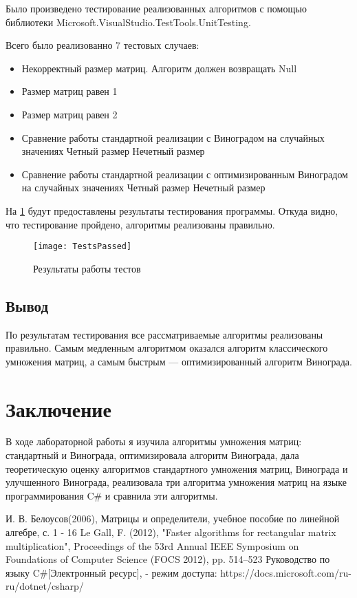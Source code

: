 \documentclass[12pt]{report}
\begin{document}
Было произведено тестирование реализованных алгоритмов с помощью библиотеки Microsoft.VisualStudio.TestTools.UnitTesting.

Всего было реализованно 7 тестовых случаев:
\begin{itemize}
	\item Некорректный размер матриц. Алгоритм должен возвращать Null
	\item Размер матриц равен 1
	\item Размер матриц равен 2
	\item Сравнение работы стандартной реализации с Виноградом на случайных значениях
	\subitem Четный размер
	\subitem Нечетный размер
	\item Сравнение работы стандартной реализации с оптимизированным Виноградом на случайных значениях
	\subitem Четный размер
	\subitem Нечетный размер
\end{itemize}

На \ref{fig:test} будут предоставлены результаты тестирования программы. Откуда видно, что тестирование пройдено, алгоритмы реализованы правильно.
\begin{figure}[!htbp]
\centering
\texttt{[image: TestsPassed]}
\caption{Результаты работы тестов}
\label{fig:test}
\end{figure} 


\section{Вывод}
По результатам тестирования все рассматриваемые алгоритмы реализованы правильно. Самым медленным алгоритмом оказался алгоритм классического умножения матриц, а самым быстрым — оптимизированный алгоритм Винограда.

\chapter*{Заключение}
В ходе лабораторной работы я изучила алгоритмы умножения матриц: стандартный и Винограда, оптимизировала алгоритм Винограда, дала теоретическую оценку алгоритмов стандартного умножения матриц, Винограда и улучшенного Винограда, реализовала три алгоритма умножения матриц на языке программирования C\# и сравнила эти алгоритмы.

 \begin{thebibliography}{3}
И. В. Белоусов(2006), Матрицы и определители, учебное пособие по линейной алгебре, с. 1 - 16
Le Gall, F. (2012), "Faster algorithms for rectangular matrix multiplication", Proceedings of the 53rd Annual IEEE Symposium on Foundations of Computer Science (FOCS 2012), pp. 514–523
Руководство по языку C\#[Электронный ресурс], - режим доступа: https://docs.microsoft.com/ru-ru/dotnet/csharp/
\end{thebibliography}
\end{document}
